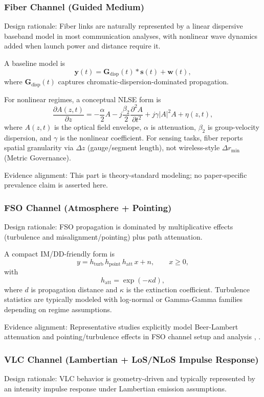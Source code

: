 \subsubsection{Fiber Channel (Guided Medium)}
Design rationale: Fiber links are naturally represented by a linear dispersive baseband model in most communication analyses, with nonlinear wave dynamics added when launch power and distance require it.

A baseline model is
\[
\mathbf{y}(t)=\mathbf{G}_{\text{disp}}(t)\ast \mathbf{s}(t)+\mathbf{w}(t),
\]
where \(\mathbf{G}_{\text{disp}}(t)\) captures chromatic-dispersion-dominated propagation.

For nonlinear regimes, a conceptual NLSE form is
\[
\frac{\partial A(z,t)}{\partial z}= -\frac{\alpha}{2}A - j\frac{\beta_2}{2}\frac{\partial^2 A}{\partial t^2} + j\gamma|A|^2A + \eta(z,t),
\]
where \(A(z,t)\) is the optical field envelope, \(\alpha\) is attenuation, \(\beta_2\) is group-velocity dispersion, and \(\gamma\) is the nonlinear coefficient. For sensing tasks, fiber reports spatial granularity via \(\Delta z\) (gauge/segment length), not wireless-style \(\Delta r_{\min}\) (Metric Governance).

Evidence alignment: This part is theory-standard modeling; no paper-specific prevalence claim is asserted here.

\subsubsection{FSO Channel (Atmosphere + Pointing)}
Design rationale: FSO propagation is dominated by multiplicative effects (turbulence and misalignment/pointing) plus path attenuation.

A compact IM/DD-friendly form is
\[
y = h_{\text{turb}}\,h_{\text{point}}\,h_{\text{att}}\,x + n,\qquad x\ge 0,
\]
with
\[
h_{\text{att}}=\exp(-\kappa d),
\]
where \(d\) is propagation distance and \(\kappa\) is the extinction coefficient. Turbulence statistics are typically modeled with log-normal or Gamma-Gamma families depending on regime assumptions.

Evidence alignment: Representative studies explicitly model Beer-Lambert attenuation and pointing/turbulence effects in FSO channel setup and analysis \cite{O_ISAC_035}, \cite{O_ISAC_005}.

\subsubsection{VLC Channel (Lambertian + LoS/NLoS Impulse Response)}
Design rationale: VLC behavior is geometry-driven and typically represented by an intensity impulse response under Lambertian emission assumptions.

